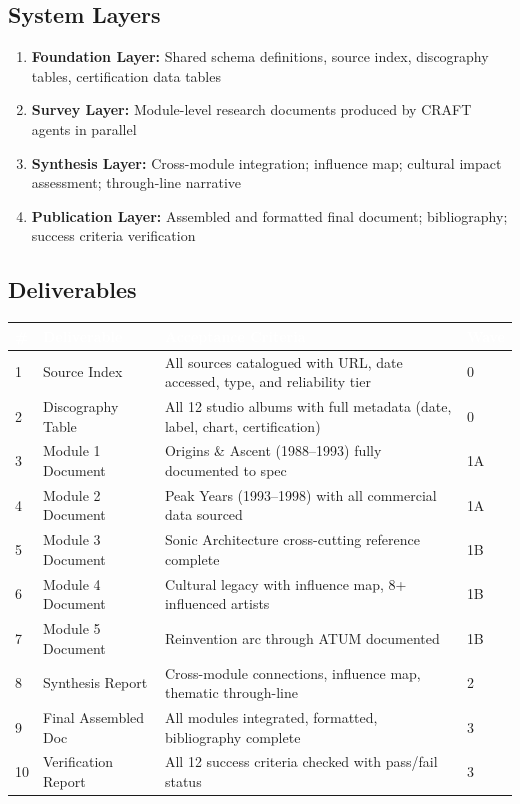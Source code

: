 \documentclass[11pt,letterpaper]{article}
\newcommand{\tableheader}[1]{\textbf{\sffamily\textcolor{white}{#1}}}
\begin{document}
\subsection{System Layers}

\begin{enumerate}
  \item \textbf{Foundation Layer:} Shared schema definitions, source index, discography tables, certification data tables
  \item \textbf{Survey Layer:} Module-level research documents produced by CRAFT agents in parallel
  \item \textbf{Synthesis Layer:} Cross-module integration; influence map; cultural impact assessment; through-line narrative
  \item \textbf{Publication Layer:} Assembled and formatted final document; bibliography; success criteria verification
\end{enumerate}

\subsection{Deliverables}

\begin{center}
\begin{tabularx}{\textwidth}{C{0.5cm}L{3.5cm}XC{2cm}}
\toprule
{}
\tableheader{\#} & \tableheader{Deliverable} & \tableheader{Acceptance Criteria} & \tableheader{Wave} \\
 & Source Index & All sources catalogued with URL, date accessed, type, and reliability tier & 0 \\
2 & Discography Table & All 12 studio albums with full metadata (date, label, chart, certification) & 0 \\
3 & Module 1 Document & Origins \& Ascent (1988--1993) fully documented to spec & 1A \\
4 & Module 2 Document & Peak Years (1993--1998) with all commercial data sourced & 1A \\
5 & Module 3 Document & Sonic Architecture cross-cutting reference complete & 1B \\
6 & Module 4 Document & Cultural legacy with influence map, 8+ influenced artists & 1B \\
7 & Module 5 Document & Reinvention arc through ATUM documented & 1B \\
8 & Synthesis Report & Cross-module connections, influence map, thematic through-line & 2 \\
9 & Final Assembled Doc & All modules integrated, formatted, bibliography complete & 3 \\
10 & Verification Report & All 12 success criteria checked with pass/fail status & 3 \\
\bottomrule
\end{tabularx}
\end{center}
\end{document}

